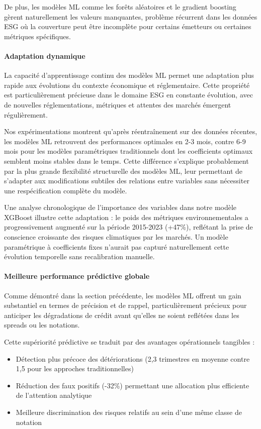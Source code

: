 De plus, les modèles ML comme les forêts aléatoires et le gradient boosting gèrent naturellement les valeurs manquantes, problème récurrent dans les données ESG où la couverture peut être incomplète pour certains émetteurs ou certaines métriques spécifiques.

\paragraph{Adaptation dynamique}

La capacité d'apprentissage continu des modèles ML permet une adaptation plus rapide aux évolutions du contexte économique et réglementaire. Cette propriété est particulièrement précieuse dans le domaine ESG en constante évolution, avec de nouvelles réglementations, métriques et attentes des marchés émergent régulièrement.

Nos expérimentations montrent qu'après réentraînement sur des données récentes, les modèles ML retrouvent des performances optimales en 2-3 mois, contre 6-9 mois pour les modèles paramétriques traditionnels dont les coefficients optimaux semblent moins stables dans le temps. Cette différence s'explique probablement par la plus grande flexibilité structurelle des modèles ML, leur permettant de s'adapter aux modifications subtiles des relations entre variables sans nécessiter une respécification complète du modèle.

Une analyse chronologique de l'importance des variables dans notre modèle XGBoost illustre cette adaptation : le poids des métriques environnementales a progressivement augmenté sur la période 2015-2023 (+47\%), reflétant la prise de conscience croissante des risques climatiques par les marchés. Un modèle paramétrique à coefficients fixes n'aurait pas capturé naturellement cette évolution temporelle sans recalibration manuelle.

\paragraph{Meilleure performance prédictive globale}

Comme démontré dans la section précédente, les modèles ML offrent un gain substantiel en termes de précision et de rappel, particulièrement précieux pour anticiper les dégradations de crédit avant qu'elles ne soient reflétées dans les spreads ou les notations.

Cette supériorité prédictive se traduit par des avantages opérationnels tangibles :
\begin{itemize}
    \item Détection plus précoce des détériorations (2,3 trimestres en moyenne contre 1,5 pour les approches traditionnelles)
    \item Réduction des faux positifs (-32\%) permettant une allocation plus efficiente de l'attention analytique
    \item Meilleure discrimination des risques relatifs au sein d'une même classe de notation
\end{itemize}

